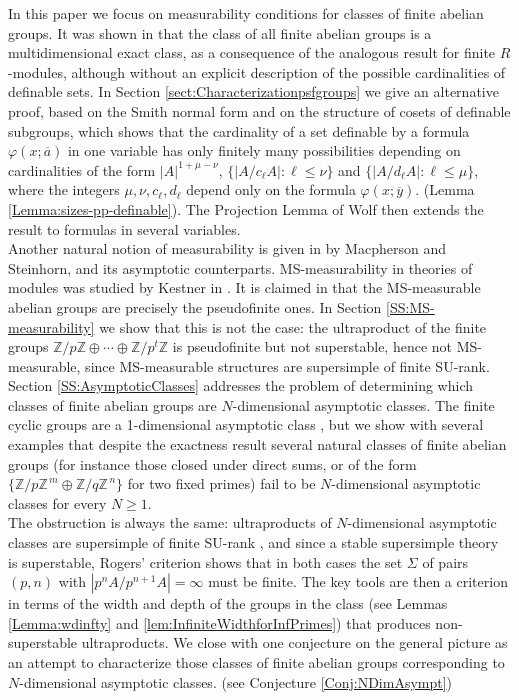 \documentclass[11pt]{amsart}
\theoremstyle{definition}
\newcommand{\ov}[1]{\overline{#1}}
\begin{document}
In this paper we focus on measurability conditions for classes of finite
abelian groups. It was shown in \cite{AMSW} that the class of all finite
abelian groups is a multidimensional exact class, as a consequence of the
analogous result for finite $R$-modules, although without an explicit
description of the possible cardinalities of definable sets. In
Section \ref{sect:Characterizationpsfgroups} we give an alternative proof, based on the Smith normal form and on
the structure of cosets of definable subgroups, which shows that the cardinality of a set definable by a formula $\varphi(x;\ov{a})$ in one variable has only finitely many possibilities depending on cardinalities of the form $|A|^{1+\mu-\nu}$, $\{|A/c_\ell A|:\ell\leq\nu\}$ and $\{|A/d_\ell A|:\ell\leq\mu\}$, where the integers $\mu,\nu,c_\ell,d_\ell$
depend only on the formula $\varphi(x;\ov{y})$. (Lemma \ref{Lemma:sizes-pp-definable}). The Projection Lemma of Wolf then extends the result to formulas in
several variables.\\

Another natural notion of measurability is given in \cite{Macpherson-Steinhorn} by 
Macpherson and Steinhorn, and its asymptotic counterparts. MS-measurability in theories of modules was studied by Kestner in \cite{Kestner2014}. It is claimed in 
\cite[Remark 4.14]{Kestner2014} that the MS-measurable abelian groups are
precisely the pseudofinite ones. In Section \ref{SS:MS-measurability} we show that this is not
the case: the ultraproduct of the finite groups
$\mathbb{Z}/p\mathbb{Z}\oplus\cdots\oplus\mathbb{Z}/p^t\mathbb{Z}$ is
pseudofinite but not superstable, hence not MS-measurable, since
MS-measurable structures are supersimple of finite SU-rank. \\

Section \ref{SS:AsymptoticClasses} addresses the problem of determining which classes of finite
abelian groups are $N$-dimensional asymptotic classes. The finite cyclic
groups are a 1-dimensional asymptotic class \cite[Theorem 3.14]{Macpherson-Steinhorn}, but we show with several examples that despite the exactness result several natural
classes of finite abelian groups (for instance those closed under direct
sums, or of the form $\{\mathbb{Z}/p\mathbb{Z}^{\,m}\oplus
\mathbb{Z}/q\mathbb{Z}^{\,n}\}$ for two fixed primes) fail to be
$N$-dimensional asymptotic classes for every $N\ge1$.\\

The obstruction is always the same: ultraproducts of $N$-dimensional
asymptotic classes are supersimple of finite SU-rank \cite{Elwes-AsymptoticClasses}, and since a stable supersimple
theory is superstable, Rogers' criterion shows
that in both cases the set $\Sigma$ of pairs $(p,n)$ with
$|p^nA/p^{n+1}A|=\infty$ must be finite. The key tools are then a criterion
in terms of the width and depth of the groups in the class
(see Lemmas \ref{Lemma:wdinfty} and \ref{lem:InfiniteWidthforInfPrimes}) that produces
non-superstable ultraproducts. We close with one conjecture on the general picture as an attempt to characterize those classes of finite abelian groups corresponding to $N$-dimensional asymptotic classes. (see Conjecture \ref{Conj:NDimAsympt})\\
\end{document}
